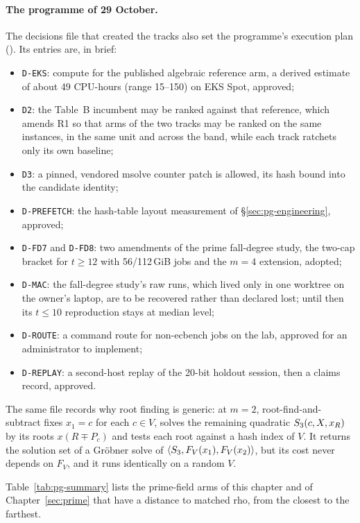 \paragraph{The programme of 29 October.} The decisions file that created
the tracks also set the programme's execution plan
(). Its entries are,
in brief:
\begin{itemize}
\item \texttt{D-EKS}: compute for the published algebraic reference arm,
  a derived estimate of about 49 CPU-hours (range 15--150) on EKS Spot,
  approved;
\item \texttt{D2}: the Table~B incumbent may be ranked against that
  reference, which amends R1 so that arms of the two tracks may be ranked on
  the same instances, in the same unit and across the band, while each track
  ratchets only its own baseline;
\item \texttt{D3}: a pinned, vendored msolve counter patch is allowed, its
  hash bound into the candidate identity;
\item \texttt{D-PREFETCH}: the hash-table layout measurement of
  \S\ref{sec:pg-engineering}, approved;
\item \texttt{D-FD7} and \texttt{D-FD8}: two amendments of the prime
  fall-degree study, the two-cap bracket for $t\ge12$ with 56/112\,GiB jobs
  and the $m=4$ extension, adopted;
\item \texttt{D-MAC}: the fall-degree study's raw runs, which lived only in
  one worktree on the owner's laptop, are to be recovered rather than
  declared lost; until then its $t\le10$ reproduction stays at median level;
\item \texttt{D-ROUTE}: a command route for non-ecbench jobs on the lab,
  approved for an administrator to implement;
\item \texttt{D-REPLAY}: a second-host replay of the 20-bit holdout session,
  then a claims record, approved.
\end{itemize}
The same file records why root finding is generic: at $m=2$,
root-find-and-subtract fixes $x_1=c$ for each $c\in V$, solves the remaining
quadratic $S_{3}(c,X,x_R)$ by its roots $x(R\mp P_c)$ and tests each root
against a hash index of $V$. It returns the solution set of a Gr\"obner solve
of $\langle S_{3},F_V(x_1),F_V(x_2)\rangle$, but its cost never depends on
$F_V$, and it runs identically on a random $V$.

Table~\ref{tab:pg-summary} lists the prime-field arms of this chapter and
of Chapter~\ref{sec:prime} that have a distance to matched rho, from the
closest to the farthest.


